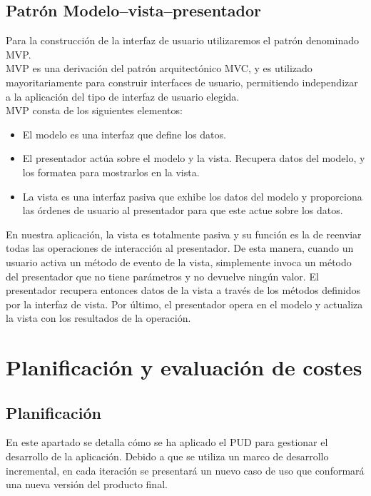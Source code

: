 \documentclass[12pt, a4paper]{book}
\begin{document}
\section{Patrón Modelo–vista–presentador}

Para la construcción de la interfaz de usuario utilizaremos el patrón denominado \gls{MVP}.\\


\gls{MVP} es una derivación del patrón arquitectónico \gls{MVC}, y es utilizado mayoritariamente para construir interfaces de usuario, permitiendo independizar a la aplicación del tipo de interfaz de usuario elegida.\\

\gls{MVP} consta de los siguientes elementos:


\begin{itemize}
	\item El modelo es una interfaz que define los datos.
	\item El presentador actúa sobre el modelo y la vista. Recupera datos del modelo, y los formatea para mostrarlos en la vista.
	\item La vista es una interfaz pasiva que exhibe los datos del modelo y proporciona las órdenes de usuario al presentador para que este actue sobre los datos.
\end{itemize}

En nuestra aplicación, la vista es totalmente pasiva y su función es la de reenviar todas las operaciones de interacción al presentador. De esta manera, cuando un usuario activa un método de evento de la vista, simplemente invoca un método del presentador que no tiene parámetros y no devuelve ningún valor. El presentador recupera entonces datos de la vista a través de los métodos definidos por la interfaz de vista. Por último, el presentador opera en el modelo y actualiza la vista con los resultados de la operación. 

\newpage

\chapter{Planificación y evaluación de costes}

\section{Planificación}
En este apartado se detalla cómo se ha aplicado el \gls{PUD} para gestionar el desarrollo de la aplicación. Debido a que se utiliza un marco de desarrollo incremental, en cada iteración se presentará un nuevo caso de uso que conformará una nueva versión del producto final.\\
\end{document}
